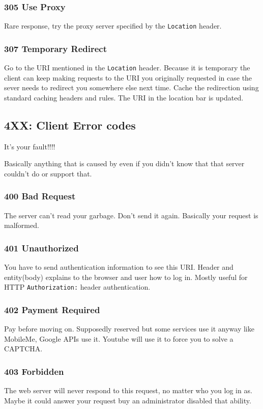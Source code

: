 \documentclass[../CMPUT-404-Notes.tex]{subfiles}
\begin{document}
\subsubsection{305 Use Proxy}
Rare response, try the proxy server specified by the \texttt{Location} header.

\subsubsection{307 Temporary Redirect}
Go to the URI mentioned in the \texttt{Location} header. Because it is temporary the client can keep making requests to the URI you originally requested in case the sever needs to redirect you somewhere else next time. Cache the redirection using standard caching headers and rules. The URI in the location bar is updated.

\subsection{4XX: Client Error codes}
\begin{DndReadAloud}[color=bgtan]
  It's your fault!!!!
\end{DndReadAloud}
Basically anything that is caused by even if you didn't know that that server couldn't do or support that.

\subsubsection{400 Bad Request}
The server can't read your garbage. Don't send it again. Basically your request is malformed.

\subsubsection{401 Unauthorized}
You have to send authentication information to see this URI.
Header and entity(body) explains to the browser and user how to log in.
Mostly useful for HTTP \texttt{Authorization:} header authentication.

\subsubsection{402 Payment Required}
Pay before moving on. Supposedly reserved but some services use it anyway like MobileMe, Google APIs use it. Youtube will use it to force you to solve a CAPTCHA.

\subsubsection{403 Forbidden}
The web server will never respond to this request, no matter who you log in as. Maybe it could answer your request buy an administrator disabled that ability.
\end{document}
